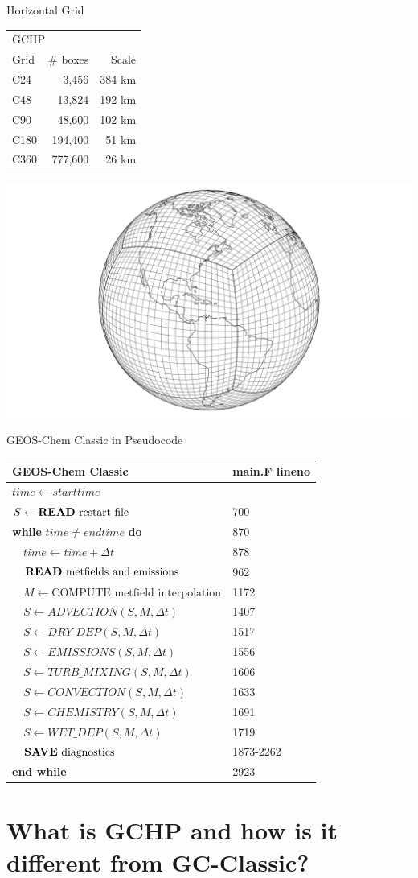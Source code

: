 \documentclass[10pt]{beamer}
\newcommand{\gccpseudocode}{%
    \small
    \setlength{\tabcolsep}{20pt}
    \begin{table}[]
    \begin{tabular}{ll}
    \hline
    \textbf{GEOS-Chem Classic} & main.F lineno \\ \hline
    $time \leftarrow starttime$ &  \\
    $S \leftarrow \text{\textbf{READ} restart file}$ &  700 \\
    \textbf{while} $time \neq endtime$ \textbf{do} & 870 \\
    $\quad time \leftarrow time + \Delta t$ & 878 \\
    $\quad \text{\textbf{READ} metfields and emissions}$ & 962 \\
    $\quad M \leftarrow \text{COMPUTE metfield interpolation}$ & 1172 \\
    $\quad S \leftarrow ADVECTION(S, M, \Delta t)$ & 1407 \\
    $\quad S \leftarrow DRY\_DEP(S, M, \Delta t)$ & 1517 \\
    $\quad S \leftarrow EMISSIONS(S, M, \Delta t)$ & 1556 \\
    $\quad S \leftarrow TURB\_MIXING(S, M, \Delta t)$ & 1606 \\
    $\quad S \leftarrow CONVECTION(S, M, \Delta t)$ & 1633 \\
    $\quad S \leftarrow CHEMISTRY(S, M, \Delta t)$& 1691 \\
    $\quad S \leftarrow WET\_DEP(S, M, \Delta t)$ & 1719 \\
    $\quad \text{\textbf{SAVE} diagnostics}$ & 1873-2262 \\
    \textbf{end while} & 2923 \\ \hline
    \end{tabular}
    \end{table}
}
\begin{document}
\begin{frame}[fragile]{Horizontal Grid}
    \small
    \begin{minipage}[c]{0.5\textwidth}
        \begin{table}[]
        \begin{tabular}{lrr}
        \hline
            \multicolumn{3}{l}{GCHP} \\ 
            Grid & \# boxes & Scale \\ 
            \hline
            C24 & 3,456 & 384 km\\ 
            C48 & 13,824 & 192 km\\ 
            C90 & 48,600 & 102 km \\ 
            C180 & 194,400 & 51 km \\ 
            C360 & 777,600 & 26 km \\ 
            \hline
        \end{tabular}
        \end{table}
    \end{minipage}
    \begin{minipage}[c]{0.49\textwidth}
        \includegraphics[height=0.4\textheight]{hgrid_c24.png}
    \end{minipage}
\end{frame}

\begin{frame}{GEOS-Chem Classic in Pseudocode}
    \gccpseudocode
\end{frame}

\section{What is GCHP and how is it different from GC-Classic?}
\end{document}
